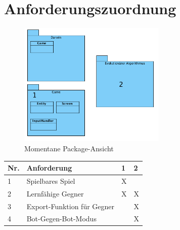 \section{Anforderungszuordnung}
\begin{figure}[htb]

	\centering

	\includegraphics[width=7cm]{class.png}

	\caption{Momentane Package-Ansicht}

	\end{figure}
\begin{tabularx}{\textwidth}{|p{0.7cm}|p{7.0cm}|X|X|}
\hline
Nr. & Anforderung & 1 & 2 \\
\hline
1 & Spielbares Spiel & X & \\
\hline
2 & Lernfähige Gegner & X & X  \\
\hline
3 & Export-Funktion für Gegner & & X  \\
\hline
4 & Bot-Gegen-Bot-Modus & & X    \\
\hline
\end{tabularx}

